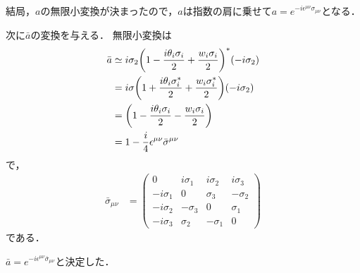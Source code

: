 結局，$a$の無限小変換が決まったので，$a$は指数の肩に乗せて$a = e^{-i\epsilon^{\mu\nu}\sigma_{\mu\nu}}$となる．

次に$\bar{a}$の変換を与える．
無限小変換は
\begin{align}
		\bar{a} &\simeq i\sigma_2\qty(1 - \frac{i\theta_i\sigma_i}{2} + \frac{w_i\sigma_i}{2})^{*}(-i\sigma_2)\\
				&= i\sigma\qty(1 + \frac{i\theta_i\sigma_i^{*}}{2} + \frac{w_i\sigma_{i}^{*}}{2})(-i\sigma_2)\\
				&= \qty(1 - \frac{i\theta_i\sigma_i}{2} - \frac{w_i\sigma_i}{2})\\
				&= 1 - \frac{i}{4}\epsilon^{\mu\nu}\bar{\sigma}^{\mu\nu}
\end{align}
で，
\begin{align}
		\bar{\sigma}_{\mu\nu}
		&=
		\begin{pmatrix}
				0 & i\sigma_1 & i\sigma_2 & i\sigma_3\\
				-i\sigma_1 & 0 & \sigma_3 & -\sigma_2\\
				-i\sigma_2 & -\sigma_3 & 0 & \sigma_1\\
				-i\sigma_3 & \sigma_2 & -\sigma_1 & 0
		\end{pmatrix}
\end{align}
である．


$\bar{a} = e^{-i\epsilon^{\mu\nu}\bar{\sigma}_{\mu\nu}}$と決定した．

